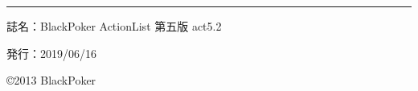 \documentclass[twocolumn,a5paper,papersize,10pt]{jarticle}
\begin{document}
\thispagestyle{empty}
\begin{flushright}
\begin{minipage}{0.8\hsize}
\hrule height 0.2mm depth 0mm width 50mm %
\begin{description}
  \item{誌名：}BlackPoker ActionList 第五版 act5.2
  \item{発行：}2019/06/16
\end{description}
\end{minipage}
\end{flushright}

\begin{flushright}
\copyright 2013 BlackPoker
\end{flushright}
\end{document}
